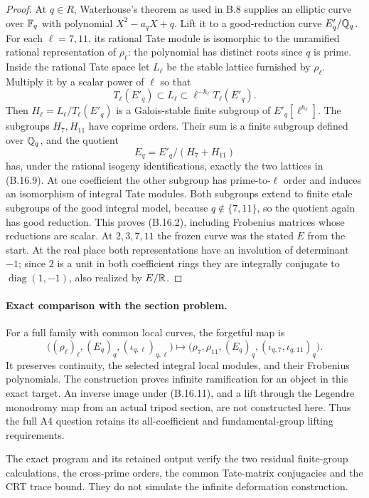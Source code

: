 \begin{proof}
At $q\in R$, Waterhouse's theorem as used in B.8 supplies
an elliptic curve over $\mathbb F_q$ with polynomial $X^2-a_qX+q$.
Lift it to a good-reduction curve $E'_q/\mathbb Q_q$.
For each $\ell=7,11$, its rational Tate module is isomorphic
to the unramified rational representation of $\rho_\ell$:
the polynomial has distinct roots since $q$ is prime.
Inside the rational Tate space let $L_\ell$ be the stable
lattice furnished by $\rho_\ell$.  Multiply it by a scalar
power of $\ell$ so that
\[
 T_\ell(E'_q)\subset L_\ell
                   \subset\ell^{-h_\ell}T_\ell(E'_q).
 \tag{B.16.9}
\]
Then $H_\ell=L_\ell/T_\ell(E'_q)$ is a Galois-stable
finite subgroup of $E'_q[\ell^{h_\ell}]$.
The subgroups $H_7,H_{11}$ have coprime orders.  Their sum
is a finite subgroup defined over $\mathbb Q_q$, and the quotient
\[
                      E_q=E'_q/(H_7+H_{11})
 \tag{B.16.10}
\]
has, under the rational isogeny identifications, exactly the
two lattices in (B.16.9).  At one coefficient the other
subgroup has prime-to-$\ell$ order and induces an isomorphism
of integral Tate modules.  Both subgroups extend to finite
etale subgroups of the good integral model, because
$q\notin\{7,11\}$, so the quotient again has good reduction.
This proves (B.16.2), including Frobenius matrices whose
reductions are scalar.  At $2,3,7,11$ the frozen curve was
the stated $E$ from the start.  At the real place both
representations have an involution of determinant $-1$;
since $2$ is a unit in both coefficient rings they are
integrally conjugate to $\operatorname{diag}(1,-1)$,
also realized by $E/\mathbb R$.
\end{proof}

\paragraph{Exact comparison with the section problem.}
For a full family with common local curves, the forgetful map is
\[
 \bigl((\rho_\ell)_\ell,(E_q)_q,(\iota_{q,\ell})_{q,\ell}\bigr)
 \longmapsto
 \bigl(\rho_7,\rho_{11},(E_q)_q,
              (\iota_{q,7},\iota_{q,11})_q\bigr).
 \tag{B.16.11}
\]
It preserves continuity, the selected integral local modules,
and their Frobenius polynomials.  The construction proves
infinite ramification for an object in this exact target.
An inverse image under (B.16.11), and a lift through the
Legendre monodromy map from an actual tripod section,
are not constructed here.  Thus the full A4 question retains
its all-coefficient and fundamental-group lifting requirements.

The exact program 
and its retained output verify the two residual finite-group
calculations, the cross-prime orders, the common Tate-matrix
conjugacies and the CRT trace bound.  They do not simulate
the infinite deformation construction.
